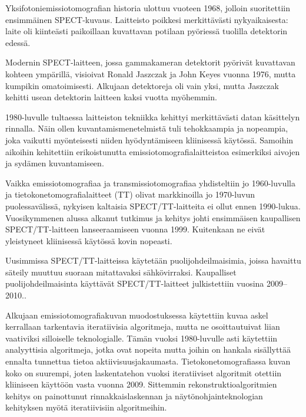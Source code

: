 Yksifotoniemissiotomografian historia ulottuu vuoteen 1968, jolloin suoritettiin ensimmäinen SPECT-kuvaus. Laitteisto poikkesi merkittävästi nykyaikaisesta: laite oli kiinteästi paikoillaan kuvattavan potilaan pyöriessä tuolilla detektorin edessä.\cite{jaszczak_early_2006, hutton_origins_2014}
%

Modernin SPECT-laitteen, jossa gammakameran detektorit pyörivät kuvattavan kohteen ympärillä, visioivat Ronald Jaszczak ja John Keyes vuonna 1976, mutta kumpikin omatoimisesti\cite{jaszczak_early_2006}. Alkujaan detektoreja oli vain yksi, mutta Jaszczak kehitti usean detektorin laitteen kaksi vuotta myöhemmin\cite{jaszczak_early_2006, hutton_origins_2014}.

1980-luvulle tultaessa laitteiston tekniikka kehittyi merkittävästi datan käsittelyn rinnalla. Näin ollen kuvantamismenetelmistä tuli tehokkaampia ja nopeampia, joka vaikutti myönteisesti niiden hyödyntämiseen kliinisessä käytössä\cite{jaszczak_early_2006}. Samoihin aikoihin kehitettiin erikoistunutta emissiotomografialaitteistoa esimerkiksi aivojen ja sydämen kuvantamiseen\cite{hutton_origins_2014}.

Vaikka emissiotomografiaa ja transmissiotomografiaa yhdisteltiin jo 1960-luvulla ja tietokonetomografialaitteet (TT) olivat markkinoilla jo 1970-luvun puolessavälissä, nykyisen kaltaisia SPECT/TT-laitteita ei ollut ennen 1990-lukua\cite{bercovich_medical_2018, hutton_origins_2014, willemink_evolution_2019}. Vuosikymmenen alussa alkanut tutkimus ja kehitys johti ensimmäisen kaupallisen SPECT/TT-laitteen lanseeraamiseen vuonna 1999. Kuitenkaan ne eivät yleistyneet kliinisessä käytössä kovin nopeasti.\cite{hutton_origins_2014}

Uusimmissa SPECT/TT-laitteissa käytetään puolijohdeilmaisimia, joissa havaittu säteily muuttuu suoraan mitattavaksi sähkövirraksi. Kaupalliset puolijohdeilmaisinta käyttävät SPECT/TT-laitteet julkistettiin vuosina 2009--2010.\cite{hutton_origins_2014}.

Alkujaan emissiotomografiakuvan muodostuksessa käytettiin kuvaa askel kerrallaan tarkentavia iteratiivisia algoritmeja, mutta ne osoittautuivat liian vaativiksi silloiselle teknologialle. Tämän vuoksi 1980-luvulle asti käytettiin analyyttisia algoritmeja, jotka ovat nopeita mutta joihin on hankala sisällyttää ennalta tunnettua tietoa aktiivisuusjakaumasta.\cite{willemink_evolution_2019} Tietokonetomografiassa kuvan koko on suurempi, joten laskentatehon vuoksi iteratiiviset algoritmit otettiin kliiniseen käyttöön vasta vuonna 2009. Sittemmin rekonstruktioalgoritmien kehitys on painottunut rinnakkaislaskennan ja näytönohjainteknologian kehityksen myötä iteratiivisiin algoritmeihin.\cite{willemink_evolution_2019} 

